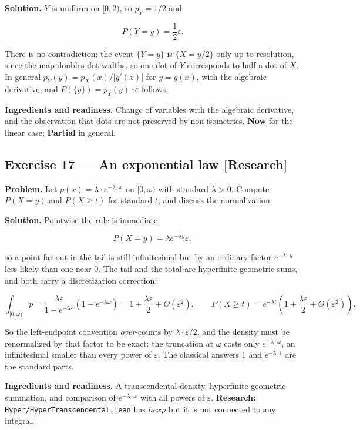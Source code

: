 \documentclass[11pt]{article}
\newcommand{\eps}{\varepsilon}
\renewcommand{\epsilon}{\varepsilon}
\begin{document}
\textbf{Solution.} $Y$ is uniform on $[0,2)$, so $p_Y = 1/2$ and

\[
P(Y=y)=\frac12\epsilon .
\]

There is no contradiction: the event $\{Y = y\}$ is $\{X = y/2\}$ only up to
resolution, since the map doubles dot widths, so one dot of $Y$ corresponds to
half a dot of $X$. In general $p_Y(y) = p_X(x)/|g'(x)|$ for $y = g(x)$, with
the algebraic derivative, and $P(\{y\}) = p_Y(y)\cdot \eps$ follows.

\textbf{Ingredients and readiness.} Change of variables with the algebraic
derivative, and the observation that dots are not preserved by non-isometries.
\textbf{Now} for the linear case; \textbf{Partial} in general.


\subsection*{Exercise 17 --- An exponential law \hfill \normalfont\small[Research]}

\textbf{Problem.} Let $p(x) = \lambda\cdot e^{-\lambda\cdot x}$ on $[0, \omega)$ with standard
$\lambda > 0$. Compute $P(X = y)$ and $P(X \ge  t)$ for standard $t$, and discuss
the normalization.

\textbf{Solution.} Pointwise the rule is immediate,

\[
P(X=y)=\lambda e^{-\lambda y}\epsilon ,
\]

so a point far out in the tail is still infinitesimal but by an ordinary
factor $e^{-\lambda\cdot y}$ less likely than one near $0$. The tail and the total
are hyperfinite geometric sums, and both carry a discretization correction:

\[
\int_{[0,\omega)} p
=\frac{\lambda\epsilon}{1-e^{-\lambda\epsilon}}\left(1-e^{-\lambda\omega}\right)
=1+\frac{\lambda\epsilon}2+O(\epsilon^{2}),
\qquad
P(X\ge t)=e^{-\lambda t}\left(1+\frac{\lambda\epsilon}2+O(\epsilon^{2})\right).
\]

So the left-endpoint convention \emph{over}-counts by $\lambda\cdot \eps/2$, and the
density must be renormalized by that factor to be exact; the truncation at
$\omega$ costs only $e^{-\lambda\cdot \omega}$, an infinitesimal smaller than every
power of $\eps$. The classical answers $1$ and $e^{-\lambda\cdot t}$ are the
standard parts.

\textbf{Ingredients and readiness.} A transcendental density, hyperfinite geometric
summation, and comparison of $e^{-\lambda\cdot \omega}$ with all powers of $\eps$.
\textbf{Research:} \texttt{Hyper/HyperTranscendental.lean} has $hexp$ but it is not
connected to any integral.
\end{document}
